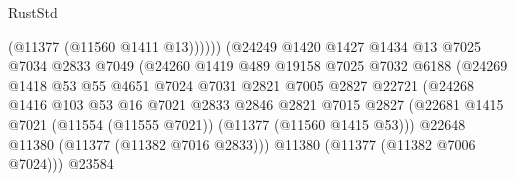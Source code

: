 \begin{lexlean}{RustStd}
\begin{coremodule}
                                              (@11377 (@11560 @1411 @13))))))
                                      (@24249
                                        @1420
                                        @1427
                                        @1434
                                        @13
                                        @7025
                                        @7034
                                        @2833
                                        @7049
                                        (@24260
                                          @1419
                                          @489
                                          @19158
                                          @7025
                                          @7032
                                          @6188
                                          (@24269
                                            @1418
                                            @53
                                            @55
                                            @4651
                                            @7024
                                            @7031
                                            @2821
                                            @7005
                                            @2827
                                            @22721
                                            (@24268
                                              @1416
                                              @103
                                              @53
                                              @16
                                              @7021
                                              @2833
                                              @2846
                                              @2821
                                              @7015
                                              @2827
                                              (@22681
                                                @1415
                                                @7021
                                                (@11554 (@11555 @7021))
                                                (@11377 (@11560 @1415 @53)))
                                              @22648
                                              @11380
                                              (@11377 (@11382 @7016 @2833)))
                                            @11380
                                            (@11377 (@11382 @7006 @7024)))
                                          @23584

\end{coremodule}
\end{lexlean}
